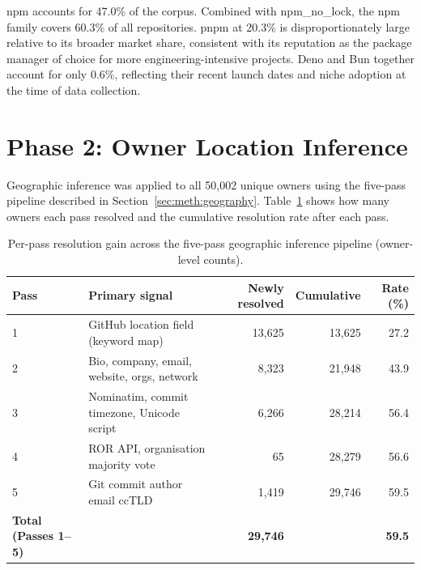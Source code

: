 npm accounts for 47.0\% of the corpus. Combined with npm\_no\_lock, the npm family covers 60.3\% of all repositories. pnpm at 20.3\% is disproportionately large relative to its broader market share, consistent with its reputation as the package manager of choice for more engineering-intensive projects. Deno and Bun together account for only 0.6\%, reflecting their recent launch dates and niche adoption at the time of data collection.

\section{Phase 2: Owner Location Inference}
\label{sec:res:location}

Geographic inference was applied to all 50,002 unique owners using the five-pass pipeline described in Section~\ref{sec:meth:geography}. Table~\ref{tab:pass_breakdown} shows how many owners each pass resolved and the cumulative resolution rate after each pass.

\begin{table}[h]
\centering
\caption{Per-pass resolution gain across the five-pass geographic inference pipeline (owner-level counts).}
\label{tab:pass_breakdown}
\begin{tabular}{@{}llrrr@{}}
\toprule
Pass & Primary signal & Newly resolved & Cumulative & Rate (\%) \\
\midrule
1 & GitHub location field (keyword map)          & 13,625 & 13,625 & 27.2 \\
2 & Bio, company, email, website, orgs, network  &  8,323 & 21,948 & 43.9 \\
3 & Nominatim, commit timezone, Unicode script   &  6,266 & 28,214 & 56.4 \\
4 & ROR API, organisation majority vote          &     65 & 28,279 & 56.6 \\
5 & Git commit author email ccTLD                &  1,419 & 29,746 & 59.5 \\
\midrule
\textbf{Total (Passes 1--5)} & & \textbf{29,746} & & \textbf{59.5} \\
\bottomrule
\end{tabular}
\end{table}


